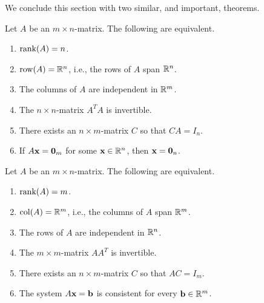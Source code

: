 We conclude this section with two similar, and important, theorems.

\begin{theorem}{}{}
  Let $A$ be an $m\times n$-matrix.
  The following are equivalent.
  \begin{enumerate}
  \item $\rank(A)=n$.
  \item $\row(A)=\R^n$, i.e., the rows of $A$ span $\mathbb{R}^n$.
  \item The columns of $A$ are independent in $\mathbb{R}^m$.
  \item The $n\times n$-matrix $A^TA$ is invertible.
  \item There exists an $n\times m$-matrix $C$ so that $CA=I_n$.
  \item If $A\mbox{\bf x}=\mbox{\bf 0}_m$ for some $\mbox{\bf x}\in\mathbb{R}^n$,
    then $\mbox{\bf x}=\mbox{\bf 0}_n$.
  \end{enumerate}
\end{theorem}

\begin{theorem}{}{}
  Let $A$ be an $m\times n$-matrix.
  The following are equivalent.
  \begin{enumerate}
  \item $\rank(A)=m$.
  \item $\col(A)=\R^m$, i.e., the columns of $A$ span $\mathbb{R}^m$.
  \item The rows of $A$ are independent in $\mathbb{R}^n$.
  \item The $m\times m$-matrix $AA^T$ is invertible.
  \item There exists an $n\times m$-matrix $C$ so that $AC=I_m$.
  \item The system $A\mbox{\bf x}=\mbox{\bf b}$ is consistent for
    every $\mbox{\bf b}\in\mathbb{R}^m$.
  \end{enumerate}
\end{theorem}
